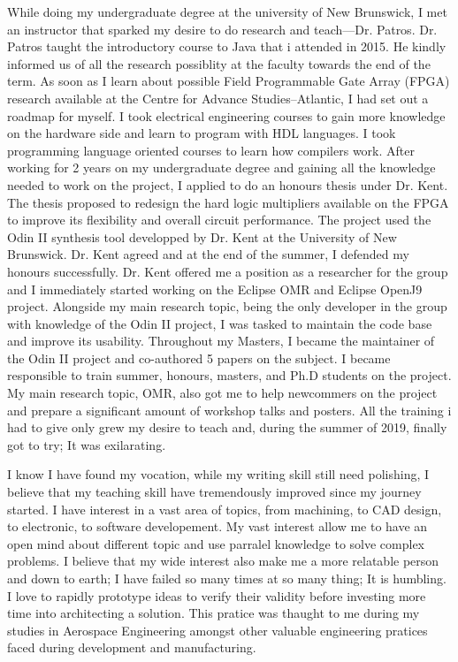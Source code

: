 \documentclass[english,letterpaper,12pt]{deedy-resume-openfont}
\begin{document}
While doing my undergraduate degree at the university of New Brunswick, I met an instructor that sparked my desire to do research and teach---Dr. Patros.
Dr. Patros taught the introductory course to Java that i attended in 2015.
He kindly informed us of all the research possiblity at the faculty towards the end of the term.
As soon as I learn about possible Field Programmable Gate Array (FPGA) research available at the Centre for Advance Studies--Atlantic, I had set out a roadmap for myself.
I took electrical engineering courses to gain more knowledge on the hardware side and learn to program with HDL languages.
I took programming language oriented courses to learn how compilers work.
After working for 2 years on my undergraduate degree and gaining all the knowledge needed to work on the project, I applied to do an honours thesis under Dr. Kent.
The thesis proposed to redesign the hard logic multipliers available on the FPGA to improve its flexibility and overall circuit performance.
The project used the Odin II synthesis tool developped by Dr. Kent at the University of New Brunswick.
Dr. Kent agreed and at the end of the summer, I defended my honours successfully.
Dr. Kent offered me a position as a researcher for the group and I immediately started working on the Eclipse OMR and Eclipse OpenJ9 project.
Alongside my main research topic, being the only developer in the group with knowledge of the Odin II project, I was tasked to maintain the code base and improve its usability.
Throughout my Masters, I became the maintainer of the Odin II project and co-authored 5 papers on the subject.
I became responsible to train summer, honours, masters, and Ph.D students on the project.
My main research topic, OMR, also got me to help newcommers on the project and prepare a significant amount of workshop talks and posters.
All the training i had to give only grew my desire to teach and, during the summer of 2019, finally got to try; It was exilarating.

I know I have found my vocation, while my writing skill still need polishing, I believe that my teaching skill have tremendously improved since my journey started.
I have interest in a vast area of topics, from machining, to CAD design, to electronic, to software developement.
My vast interest allow me to have an open mind about different topic and use parralel knowledge to solve complex problems.
I believe that my wide interest also make me a more relatable person and down to earth; I have failed so many times at so many thing; It is humbling.
I love to rapidly prototype ideas to verify their validity before investing more time into architecting a solution.
This pratice was thaught to me during my studies in Aerospace Engineering amongst other valuable engineering pratices faced during development and manufacturing.
\end{document}
